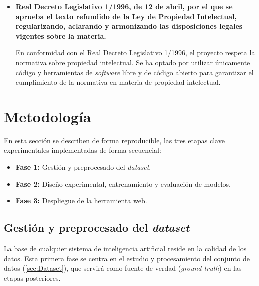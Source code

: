 \documentclass[12pt,a4paper,onecolumn,oneside]{report}
\begin{document}
\begin{itemize}
    \item \textbf{Real Decreto Legislativo 1/1996, de 12 de abril, por el que se aprueba el texto refundido de la Ley de Propiedad Intelectual, regularizando, aclarando y armonizando las disposiciones legales vigentes sobre la materia.}\cite{RDL1996}
    
    En conformidad con el Real Decreto Legislativo 1/1996, el proyecto respeta la normativa sobre propiedad intelectual. Se ha optado por utilizar 
    únicamente código y herramientas de \textit{software} libre y de código abierto para garantizar el cumplimiento de la normativa en materia de propiedad 
    intelectual.
\end{itemize}


\chapter{Metodología} %
\label{metodologia}

En esta sección se describen de forma reproducible, las tres etapas clave experimentales implementadas de forma secuencial: 
\begin{itemize}
  \item \textbf{Fase 1:} Gestión y preprocesado del \textit{dataset}.
  \item \textbf{Fase 2:} Diseño experimental, entrenamiento y evaluación de modelos.
  \item \textbf{Fase 3:} Despliegue de la herramienta web.
\end{itemize}

\section{Gestión y preprocesado del \textit{dataset}}
\label{Gestión y preprocesado del dataset}

La base de cualquier sistema de inteligencia artificial reside en la calidad de los datos. Esta primera fase se centra en el estudio y procesamiento del conjunto de datos (\autoref{sec:Dataset}), que servirá como
fuente de verdad (\textit{ground truth}) en las etapas posteriores.
\end{document}
